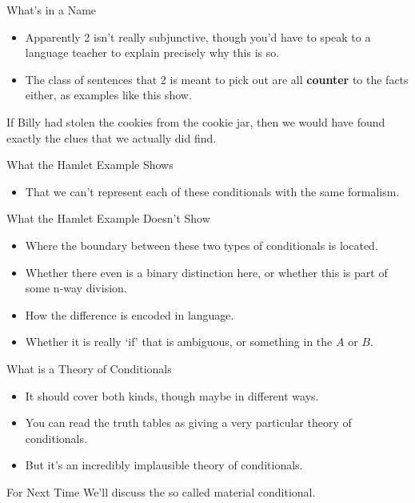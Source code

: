 \documentclass[
  ignorenonframetext,
]{beamer}
\providecommand{\tightlist}{%
  \setlength{\itemsep}{0pt}\setlength{\parskip}{0pt}}
\renewcommand{\,}{\text{, }}
\renewenvironment*{quote}	
	{\list{}{\rightmargin   \leftmargin} \item } 	
	{\endlist }
\begin{document}
\begin{frame}{What's in a Name}
\protect\hypertarget{whats-in-a-name}{}
\begin{itemize}
\tightlist
\item
  Apparently 2 isn't really subjunctive, though you'd have to speak to a
  language teacher to explain precisely why this is so.
\item
  The class of sentences that 2 is meant to pick out are all
  \textbf{counter} to the facts either, as examples like this show.
\end{itemize}

\begin{quote}
If Billy had stolen the cookies from the cookie jar, then we would have
found exactly the clues that we actually did find.
\end{quote}
\end{frame}

\begin{frame}{What the Hamlet Example Shows}
\protect\hypertarget{what-the-hamlet-example-shows}{}
\begin{itemize}
\tightlist
\item
  That we can't represent each of these conditionals with the same
  formalism.
\end{itemize}
\end{frame}

\begin{frame}{What the Hamlet Example Doesn't Show}
\protect\hypertarget{what-the-hamlet-example-doesnt-show}{}
\begin{itemize}
\tightlist
\item
  Where the boundary between these two types of conditionals is located.
  \pause 
\item
  Whether there even is a binary distinction here, or whether this is
  part of some n-way division. \pause 
\item
  How the difference is encoded in language. \pause 
\item
  Whether it is really `if' that is ambiguous, or something in the \(A\)
  or \(B\).
\end{itemize}
\end{frame}

\begin{frame}{What is a Theory of Conditionals}
\protect\hypertarget{what-is-a-theory-of-conditionals}{}
\begin{itemize}
\tightlist
\item
  It should cover both kinds, though maybe in different ways. \pause 
\item
  You can read the truth tables as giving a very particular theory of
  conditionals. \pause 
\item
  But it's an incredibly implausible theory of conditionals.
\end{itemize}
\end{frame}

\begin{frame}{For Next Time}
\protect\hypertarget{for-next-time}{}
We'll discuss the so called material conditional.
\end{frame}
\end{document}
